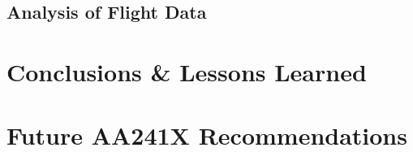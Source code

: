 \documentclass[11pt]{article}
\begin{document}
\subsection{Analysis of Flight Data}
\label{AnalFltData}


\section{Conclusions \& Lessons Learned}
\label{Conclusion}

\section{Future AA241X Recommendations}
\label{Recommendations}
\end{document}
